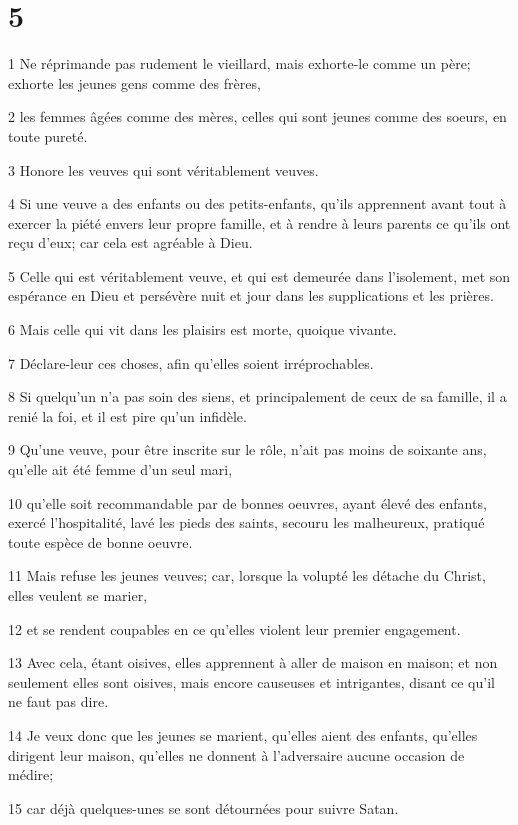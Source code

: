 \chapter{5}

\par 1 Ne réprimande pas rudement le vieillard, mais exhorte-le comme un père; exhorte les jeunes gens comme des frères,
\par 2 les femmes âgées comme des mères, celles qui sont jeunes comme des soeurs, en toute pureté.
\par 3 Honore les veuves qui sont véritablement veuves.
\par 4 Si une veuve a des enfants ou des petits-enfants, qu'ils apprennent avant tout à exercer la piété envers leur propre famille, et à rendre à leurs parents ce qu'ils ont reçu d'eux; car cela est agréable à Dieu.
\par 5 Celle qui est véritablement veuve, et qui est demeurée dans l'isolement, met son espérance en Dieu et persévère nuit et jour dans les supplications et les prières.
\par 6 Mais celle qui vit dans les plaisirs est morte, quoique vivante.
\par 7 Déclare-leur ces choses, afin qu'elles soient irréprochables.
\par 8 Si quelqu'un n'a pas soin des siens, et principalement de ceux de sa famille, il a renié la foi, et il est pire qu'un infidèle.
\par 9 Qu'une veuve, pour être inscrite sur le rôle, n'ait pas moins de soixante ans, qu'elle ait été femme d'un seul mari,
\par 10 qu'elle soit recommandable par de bonnes oeuvres, ayant élevé des enfants, exercé l'hospitalité, lavé les pieds des saints, secouru les malheureux, pratiqué toute espèce de bonne oeuvre.
\par 11 Mais refuse les jeunes veuves; car, lorsque la volupté les détache du Christ, elles veulent se marier,
\par 12 et se rendent coupables en ce qu'elles violent leur premier engagement.
\par 13 Avec cela, étant oisives, elles apprennent à aller de maison en maison; et non seulement elles sont oisives, mais encore causeuses et intrigantes, disant ce qu'il ne faut pas dire.
\par 14 Je veux donc que les jeunes se marient, qu'elles aient des enfants, qu'elles dirigent leur maison, qu'elles ne donnent à l'adversaire aucune occasion de médire;
\par 15 car déjà quelques-unes se sont détournées pour suivre Satan.
